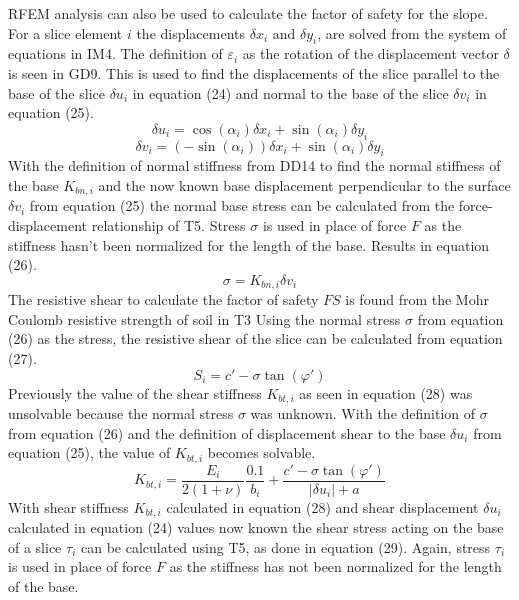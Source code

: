 \documentclass[12pt]{article}
\begin{document}
RFEM analysis can also be used to calculate the factor of safety for the slope. For a slice element $i$ the displacements $\delta{}x_{i}$ and $\delta{}y_{i}$, are solved from the system of equations in IM4. The definition of $\varepsilon{}_{i}$ as the rotation of the displacement vector $\delta{}$ is seen in GD9. This is used to find the displacements of the slice parallel to the base of the slice $\delta{}u_{i}$ in equation (24) and normal to the base of the slice $\delta{}v_{i}$ in equation (25).
\begin{equation}
\delta{}u_{i}=\cos\left(\alpha{}_{i}\right)\delta{}x_{i}+\sin\left(\alpha{}_{i}\right)\delta{}y_{i}
\end{equation}
\begin{equation}
\delta{}v_{i}=\left(-\sin\left(\alpha{}_{i}\right)\right)\delta{}x_{i}+\sin\left(\alpha{}_{i}\right)\delta{}y_{i}
\end{equation}
With the definition of normal stiffness from DD14 to find the normal stiffness of the base $K_{bn,i}$ and the now known base displacement perpendicular to the surface $\delta{}v_{i}$ from equation (25) the normal base stress can be calculated from the force-displacement relationship of T5. Stress $\sigma{}$ is used in place of force $F$ as the stiffness hasn't been normalized for the length of the base. Results in equation (26).
\begin{equation}
\sigma{}=K_{bn,i}\delta{}v_{i}
\end{equation}
The resistive shear to calculate the factor of safety $FS$ is found from the Mohr Coulomb resistive strength of soil in T3 Using the normal stress $\sigma{}$ from equation (26) as the stress, the resistive shear of the slice can be calculated from equation (27).
\begin{equation}
S_{i}=c'-\sigma{}\tan\left(\varphi{}'\right)
\end{equation}
Previously the value of the shear stiffness $K_{bt,i}$ as seen in equation (28) was unsolvable because the normal stress $\sigma{}$ was unknown. With the definition of $\sigma{}$ from equation (26) and the definition of displacement shear to the base $\delta{}u_{i}$ from equation (25), the value of $K_{bt,i}$ becomes solvable.
\begin{equation}
K_{bt,i}=\frac{E_{i}}{2\left(1+\nu{}\right)}\frac{0.1}{b_{i}}+\frac{c'-\sigma{}\tan\left(\varphi{}'\right)}{|\delta{}u_{i}|+a}
\end{equation}
With shear stiffness $K_{bt,i}$ calculated in equation (28) and shear displacement $\delta{}u_{i}$ calculated in equation (24) values now known the shear stress acting on the base of a slice $\tau{}_{i}$ can be calculated using T5, as done in equation (29). Again, stress $\tau{}_{i}$ is used in place of force $F$ as the stiffness has not been normalized for the length of the base.
\end{document}
